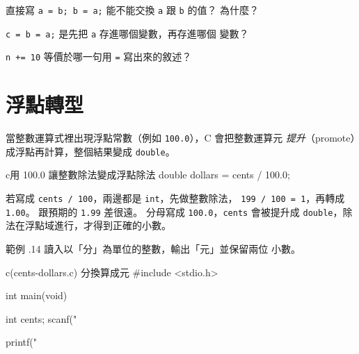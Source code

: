 

\begin{drills}[label=drills:arith-assign-update-swap]
\item 直接寫 \texttt{a = b; b = a;} 能不能交換 \texttt{a} 跟 \texttt{b}
的值？ 為什麼？
\item \texttt{c = b = a;} 是先把 \texttt{a} 存進哪個變數，再存進哪個
變數？
\item \texttt{n += 10} 等價於哪一句用 \texttt{=} 寫出來的敘述？
\end{drills}

\section{浮點轉型}
\label{sec:arith-float-cast}

當整數運算式裡出現浮點常數（例如 \texttt{100.0}），C 會把整數運算元
\emph{提升}（promote）成浮點再計算，整個結果變成 \texttt{double}。

\begin{code}{c}{用 100.0 讓整數除法變成浮點除法}
double dollars = cents / 100.0;
\end{code}

若寫成 \texttt{cents / 100}，兩邊都是 \texttt{int}，先做整數除法，
\texttt{199 / 100 = 1}，再轉成 \texttt{1.00}。 跟預期的 \texttt{1.99}
差很遠。 分母寫成 \texttt{100.0}，\texttt{cents} 會被提升成
\texttt{double}，除法在浮點域進行，才得到正確的小數。

範例 \thechapter.14 讀入以「分」為單位的整數，輸出「元」並保留兩位
小數。

\begin{example}{c}{(cents-dollars.c) 分換算成元}
#include <stdio.h>

int main(void) {
    int cents;
    scanf("%

    printf("%
}
\end{example}


